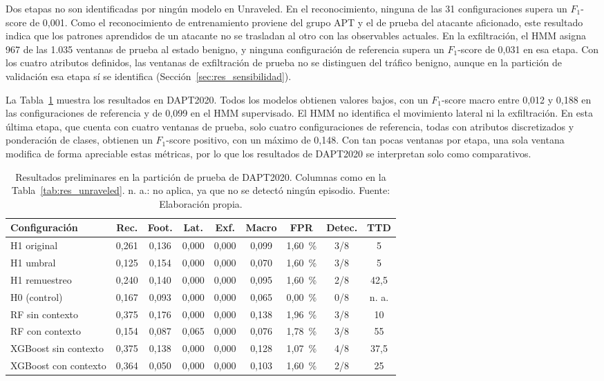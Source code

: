 Dos etapas no son identificadas por ningún modelo en Unraveled. En el reconocimiento, ninguna de las 31 configuraciones supera un $F_1$-score de 0,001. Como el reconocimiento de entrenamiento proviene del grupo APT y el de prueba del atacante aficionado, este resultado indica que los patrones aprendidos de un atacante no se trasladan al otro con las observables actuales. En la exfiltración, el HMM asigna 967 de las 1.035 ventanas de prueba al estado benigno, y ninguna configuración de referencia supera un $F_1$-score de 0,031 en esa etapa. Con los cuatro atributos definidos, las ventanas de exfiltración de prueba no se distinguen del tráfico benigno, aunque en la partición de validación esa etapa sí se identifica (Sección~\ref{sec:res_sensibilidad}).

La Tabla~\ref{tab:res_dapt} muestra los resultados en DAPT2020. Todos los modelos obtienen valores bajos, con un $F_1$-score macro entre 0,012 y 0,188 en las configuraciones de referencia y de 0,099 en el HMM supervisado. El HMM no identifica el movimiento lateral ni la exfiltración. En esta última etapa, que cuenta con cuatro ventanas de prueba, solo cuatro configuraciones de referencia, todas con atributos discretizados y ponderación de clases, obtienen un $F_1$-score positivo, con un máximo de 0,148. Con tan pocas ventanas por etapa, una sola ventana modifica de forma apreciable estas métricas, por lo que los resultados de DAPT2020 se interpretan solo como comparativos.

\begin{table}[h!]
\centering
\small
\renewcommand{\arraystretch}{1.25}
\begin{tabular}{|l|c|c|c|c|c|c|c|c|}
\hline
\textbf{Configuración} & \textbf{Rec.} & \textbf{Foot.} & \textbf{Lat.} & \textbf{Exf.} & \textbf{Macro} & \textbf{FPR} & \textbf{Detec.} & \textbf{TTD} \\ \hline
H1 original & 0,261 & 0,136 & 0,000 & 0,000 & 0,099 & 1,60~\% & 3/8 & 5 \\ \hline
H1 umbral & 0,125 & 0,154 & 0,000 & 0,000 & 0,070 & 1,60~\% & 3/8 & 5 \\ \hline
H1 remuestreo & 0,240 & 0,140 & 0,000 & 0,000 & 0,095 & 1,60~\% & 2/8 & 42,5 \\ \hline
H0 (control) & 0,167 & 0,093 & 0,000 & 0,000 & 0,065 & 0,00~\% & 0/8 & n. a. \\ \hline
RF sin contexto & 0,375 & 0,176 & 0,000 & 0,000 & 0,138 & 1,96~\% & 3/8 & 10 \\ \hline
RF con contexto & 0,154 & 0,087 & 0,065 & 0,000 & 0,076 & 1,78~\% & 3/8 & 55 \\ \hline
XGBoost sin contexto & 0,375 & 0,138 & 0,000 & 0,000 & 0,128 & 1,07~\% & 4/8 & 37,5 \\ \hline
XGBoost con contexto & 0,364 & 0,050 & 0,000 & 0,000 & 0,103 & 1,60~\% & 2/8 & 25 \\ \hline
\end{tabular}
\caption[Resultados preliminares en la partición de prueba de DAPT2020.]{Resultados preliminares en la partición de prueba de DAPT2020. Columnas como en la Tabla~\ref{tab:res_unraveled}. n. a.: no aplica, ya que no se detectó ningún episodio. Fuente: Elaboración propia.}
\label{tab:res_dapt}
\end{table}
\FloatBarrier

